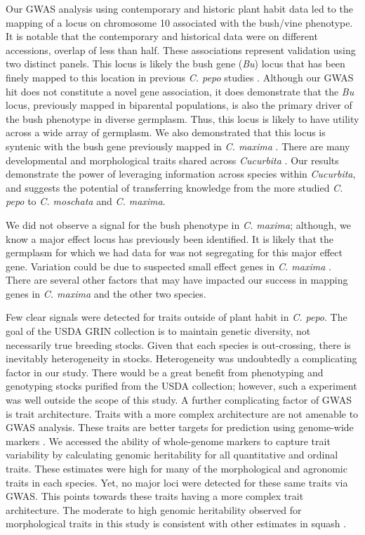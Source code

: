 \documentclass[utf8]{FrontiersinHarvard} %
\begin{document}
Our GWAS analysis using contemporary and historic plant habit data led to the mapping of a locus on chromosome 10 associated with the bush/vine phenotype. It is notable that the contemporary and historical data were on different accessions, overlap of less than half.  These associations represent validation using two distinct panels. This locus is likely the bush gene (\textit{Bu}) locus that has been finely mapped to this location in previous \textit{C. pepo} studies \citep{Xiang2018, Ding2021}. Although our GWAS hit does not constitute a novel gene association, it does demonstrate that the \textit{Bu} locus, previously mapped in biparental populations, is also the primary driver of the bush phenotype in diverse germplasm. Thus, this locus is likely to have utility across a wide array of germplasm. We also demonstrated that this locus is syntenic with the bush gene previously mapped in \textit{C. maxima} \citep{Zhang2015}. There are many developmental and morphological traits shared across \textit{Cucurbita} \citep{Paris2005}. Our results demonstrate the power of leveraging information across species within \textit{Cucurbita}, and suggests the potential of transferring knowledge from the more studied \textit{C. pepo} to \textit{C. moschata} and \textit{C. maxima}.

We did not observe a signal for the bush phenotype in \textit{C. maxima}; although, we know a major effect locus has previously been identified. It is likely that the germplasm for which we had data for was not segregating for this major effect gene. Variation could be due to suspected small effect genes in \textit{C. maxima} \citep{Loy2004}. There are several other factors that may have impacted our success in mapping genes in \textit{C. maxima} and the other two species.

Few clear signals were detected for traits outside of plant habit in \textit{C. pepo}. The goal of the USDA GRIN collection is to maintain genetic diversity, not necessarily true breeding stocks. Given that each species is out-crossing, there is inevitably heterogeneity in stocks. Heterogeneity was undoubtedly a complicating factor in our study. There would be a great benefit from phenotyping and genotyping stocks purified from the USDA collection; however, such a experiment was well outside the scope of this study. A further complicating factor of GWAS is trait architecture. Traits with a more complex architecture are not amenable to GWAS analysis. These traits are better targets for prediction using genome-wide markers \citep{Meuwissen2001}. We accessed the ability of whole-genome markers to capture trait variability by calculating genomic heritability for all quantitative and ordinal traits. These estimates were high for many of the morphological and agronomic traits in each species. Yet, no major loci were detected for these same traits via GWAS. This points towards these traits having a more complex trait architecture. The moderate to high genomic heritability observed for morphological traits in this study is consistent with other estimates in squash \citep{Hernandez2020}.
\end{document}
